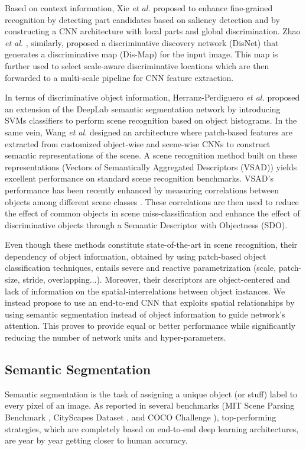\documentclass[review, 3p, sort&compress]{elsarticle}
\begin{document}
Based on context information, Xie \textit{et al.} \cite{xie2017lg} proposed to enhance fine-grained recognition by detecting part candidates based on saliency detection and by constructing a CNN architecture with local parts and global discrimination. Zhao \textit{et al.} \cite{zhao2018volcano}, similarly, proposed a discriminative discovery network (DisNet) that generates a discriminative map (Dis-Map) for the input image. This map is further used to select scale-aware discriminative locations which are then forwarded to a multi-scale pipeline for CNN feature extraction.

In terms of discriminative object information, Herranz-Perdiguero \textit{et al.} \cite{herranz2018pixels} proposed an extension of the DeepLab semantic segmentation network by introducing SVMs classifiers to perform scene recognition based on object histograms. In the same vein, Wang \textit{et al.} \cite{wang2017weakly} designed an architecture where patch-based features are extracted from customized object-wise and scene-wise CNNs to construct semantic representations of the scene. A scene recognition method built on these representations (Vectors of Semantically Aggregated Descriptors (VSAD)) yields excellent performance on standard scene recognition benchmarks. VSAD's performance has been recently enhanced by measuring correlations between objects among different scene classes \cite{cheng2018scene}. These correlations are then used to reduce the effect of common objects in scene miss-classification and enhance the effect of discriminative objects through a Semantic Descriptor with Objectness (SDO).

Even though these methods constitute state-of-the-art in scene recognition, their dependency of object information, obtained by using patch-based object classification techniques, entails severe and reactive parametrization (scale, patch-size, stride, overlapping...). Moreover, their descriptors are object-centered and lack of information on the spatial-interrelations between object instances. We instead propose to use an end-to-end CNN that exploits spatial relationships by using semantic segmentation instead of object information to guide network's attention. This proves to provide equal or better performance while significantly reducing the number of network units and hyper-parameters.

\subsection{Semantic Segmentation}
Semantic segmentation is the task of assigning a unique object (or stuff) label to every pixel of an image. As reported in several benchmarks (MIT Scene Parsing Benchmark \cite{zhou2017scene}, CityScapes Dataset \cite{Cordts2016Cityscapes}, and COCO Challenge \cite{lin2014microsoftCOCO}), top-performing strategies, which are completely based on end-to-end deep learning architectures, are year by year getting closer to human accuracy.
\end{document}
